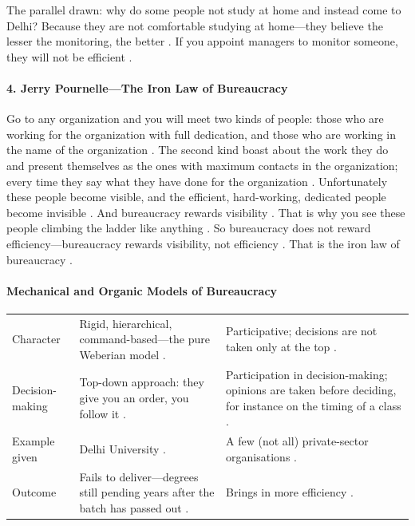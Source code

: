 The parallel drawn: why do some people not study at home and instead come to Delhi? Because they are not comfortable studying at home---they believe the lesser the monitoring, the better . If you appoint managers to monitor someone, they will not be efficient .

\paragraph{4. Jerry Pournelle---The Iron Law of Bureaucracy}
Go to any organization and you will meet two kinds of people: those who are working for the organization with full dedication, and those who are working in the name of the organization .
The second kind boast about the work they do and present themselves as the ones with maximum contacts in the organization; every time they say what they have done for the organization .
Unfortunately these people become visible, and the efficient, hard-working, dedicated people become invisible . And bureaucracy rewards visibility .
That is why you see these people climbing the ladder like anything . So bureaucracy does not reward efficiency---bureaucracy rewards visibility, not efficiency . That is the iron law of bureaucracy .

\paragraph{Mechanical and Organic Models of Bureaucracy}
\vspace{6pt}
\noindent
\begin{tabularx}{\textwidth}{>{\hsize}Y >{\hsize}Y >{\hsize}Y}
\toprule
{}
 &  &  \\
\midrule
Character & Rigid, hierarchical, command-based---the pure Weberian model . & Participative; decisions are not taken only at the top . \\
\midrule
Decision-making & Top-down approach: they give you an order, you follow it . & Participation in decision-making; opinions are taken before deciding, for instance on the timing of a class . \\
\midrule
Example given & Delhi University . & A few (not all) private-sector organisations . \\
\midrule
Outcome & Fails to deliver---degrees still pending years after the batch has passed out . & Brings in more efficiency . \\
\bottomrule
\end{tabularx}
\vspace{6pt}

